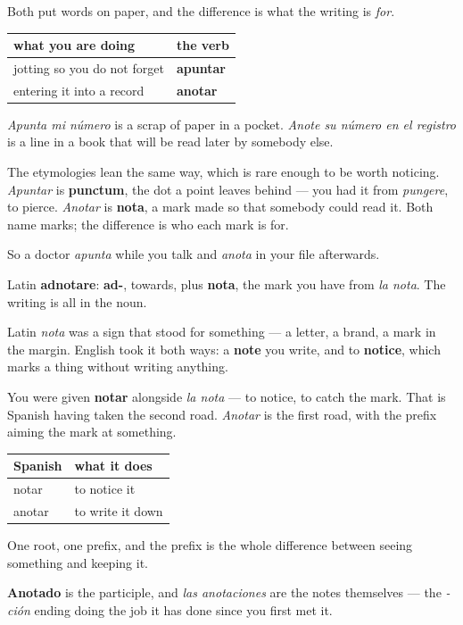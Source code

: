 \begin{grammarlens}[title={Grammar Lens: anotar is not apuntar}]
Both put words on paper, and the difference is what the writing is \emph{for}.

\noindent
\begin{tabularx}{\linewidth}{@{}>{\raggedright\arraybackslash}X>{\raggedright\arraybackslash}X@{}}
\toprule
\textbf{what you are doing} & \textbf{the verb} \\
\midrule
jotting so you do not forget & \textbf{apuntar} \\
entering it into a record & \textbf{anotar} \\
\bottomrule
\end{tabularx}

\emph{Apunta mi número} is a scrap of paper in a pocket. \emph{Anote su número en el registro} is a line in a book that will be read later by somebody else.

The etymologies lean the same way, which is rare enough to be worth noticing. \emph{Apuntar} is \textbf{punctum}, the dot a point leaves behind — you had it from \emph{pungere}, to pierce. \emph{Anotar} is \textbf{nota}, a mark made so that somebody could read it. Both name marks; the difference is who each mark is for.

So a doctor \emph{apunta} while you talk and \emph{anota} in your file afterwards.
\end{grammarlens}

\begin{cousinweb}
Latin \textbf{adnotare}: \textbf{ad-}, towards, plus \textbf{nota}, the mark you have from \emph{la nota}. The writing is all in the noun.

Latin \emph{nota} was a sign that stood for something — a letter, a brand, a mark in the margin. English took it both ways: a \textbf{note} you write, and to \textbf{notice}, which marks a thing without writing anything.

You were given \textbf{notar} alongside \emph{la nota} — to notice, to catch the mark. That is Spanish having taken the second road. \emph{Anotar} is the first road, with the prefix aiming the mark at something.

\noindent
\begin{tabularx}{\linewidth}{@{}>{\raggedright\arraybackslash}X>{\raggedright\arraybackslash}X@{}}
\toprule
\textbf{Spanish} & \textbf{what it does} \\
\midrule
notar & to notice it \\
anotar & to write it down \\
\bottomrule
\end{tabularx}

One root, one prefix, and the prefix is the whole difference between seeing something and keeping it.

\textbf{Anotado} is the participle, and \emph{las anotaciones} are the notes themselves — the \emph{-ción} ending doing the job it has done since you first met it.
\end{cousinweb}

